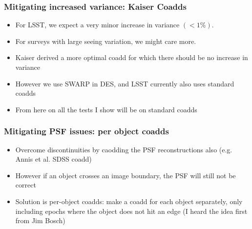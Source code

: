 \documentclass{beamer}
\begin{document}
\frame
{
    \frametitle{Mitigating increased variance: Kaiser Coadds}

    \begin{itemize}

        \item For LSST, we expect a very minor increase in variance $(< 1\%)$.

        \item For surveys with large seeing variation, we might care more.

        \item Kaiser derived a more optimal coadd for which there should be no increase in variance

        \item However we use SWARP in DES, and LSST currently also uses standard coadds

        \item From here on all the tests I show will be on standard coadds

    \end{itemize}

}



\frame
{
    \frametitle{Mitigating PSF issues: per object coadds}

    \begin{itemize}

        \item Overcome discontinuities by caodding the PSF reconstructions also (e.g. Annis et al. SDSS coadd)

        \item However if an object crosses an image boundary, the PSF will still not be correct

        \item Solution is per-object coadds: make a coadd for each object
            separately, only including epochs where the object does not hit an
            edge (I heard the idea first from Jim Bosch)


    \end{itemize}

}
\end{document}
